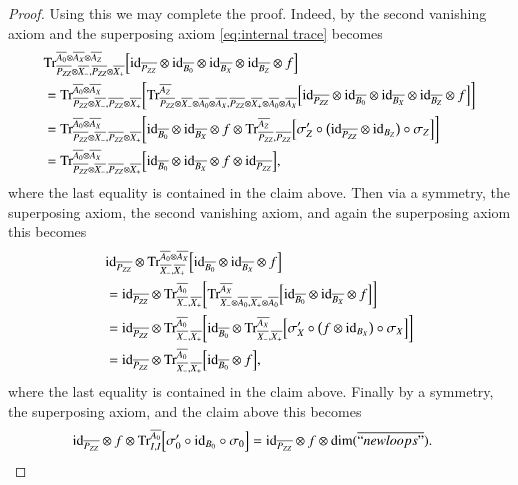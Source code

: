 \documentclass{amsart}
\def\tn{\textnormal}
\def\dim{\tn{dim}}
\def\Trace{\tn{Tr}}
\def\ol{\overline}
\def\id{\tn{id}}
\newcommand{\inp}[1]{{#1_-}}
\newcommand{\outp}[1]{{#1_+}}
\theoremstyle{remark}
\theoremstyle{definition}
\begin{document}
\begin{proof}
Using this we may complete the proof.  Indeed, by the second vanishing axiom and the superposing axiom \eqref{eq:internal trace} becomes
\begin{align*}
&\Trace^{\ol{A_0}\otimes\ol{A_X}\otimes\ol{A_Z}}_{\ol{P_{ZZ}}\otimes\ol{\inp{X}},\ol{P_{ZZ}}\otimes\ol{\outp{X}}}
\Big[\id_{\ol{P_{ZZ}}}\otimes\id_{\ol{B_0}}\otimes\id_{\ol{B_X}}\otimes\id_{\ol{B_Z}}\otimes f\Big]\\
&=\Trace^{\ol{A_0}\otimes\ol{A_X}}_{\ol{P_{ZZ}}\otimes\ol{\inp{X}},\ol{P_{ZZ}}\otimes\ol{\outp{X}}}\bigg[
\Trace^{\ol{A_Z}}_{\ol{P_{ZZ}}\otimes\ol{\inp{X}}\otimes\ol{A_0}\otimes\ol{A_X},\ol{P_{ZZ}}\otimes\ol{\outp{X}}\otimes\ol{A_0}\otimes\ol{A_X}}\Big[\id_{\ol{P_{ZZ}}}\otimes\id_{\ol{B_0}}\otimes\id_{\ol{B_X}}\otimes\id_{\ol{B_Z}}\otimes f\Big]\bigg]\\
&=\Trace^{\ol{A_0}\otimes\ol{A_X}}_{\ol{P_{ZZ}}\otimes\ol{\inp{X}},\ol{P_{ZZ}}\otimes\ol{\outp{X}}}\bigg[
\id_{\ol{B_0}}\otimes\id_{\ol{B_X}}\otimes f\otimes\Trace^{\ol{A_Z}}_{\ol{P_{ZZ}},\ol{P_{ZZ}}}\Big[\sigma_Z'\circ\big(\id_{\ol{P_{ZZ}}}\otimes\id_{B_Z}\big)\circ\sigma_Z\Big]\bigg]\\
&=\Trace^{\ol{A_0}\otimes\ol{A_X}}_{\ol{P_{ZZ}}\otimes\ol{\inp{X}},\ol{P_{ZZ}}\otimes\ol{\outp{X}}}\Big[\id_{\ol{B_0}}\otimes\id_{\ol{B_X}}\otimes f\otimes\id_{\ol{P_{ZZ}}}\Big],
\end{align*}
where the last equality is contained in the claim above.  Then via a symmetry, the superposing axiom, the second vanishing axiom, and again the superposing axiom this becomes
\begin{align*}
&\id_{\ol{P_{ZZ}}}\otimes\Trace^{\ol{A_0}\otimes\ol{A_X}}_{\ol{\inp{X}},\ol{\outp{X}}}\Big[
\id_{\ol{B_0}}\otimes\id_{\ol{B_X}}\otimes f\Big]\\
&=\id_{\ol{P_{ZZ}}}\otimes\Trace^{\ol{A_0}}_{\ol{\inp{X}},\ol{\outp{X}}}\bigg[
\Trace^{\ol{A_X}}_{\ol{\inp{X}}\otimes\ol{A_0},\ol{\outp{X}}\otimes\ol{A_0}}\Big[\id_{\ol{B_0}}\otimes\id_{\ol{B_X}}\otimes f\Big]\bigg]\\
&=\id_{\ol{P_{ZZ}}}\otimes\Trace^{\ol{A_0}}_{\ol{\inp{X}},\ol{\outp{X}}}\bigg[
\id_{\ol{B_0}}\otimes\Trace^{\ol{A_X}}_{\ol{\inp{X}},\ol{\outp{X}}}\Big[\sigma_X'\circ\big(f\otimes\id_{B_X}\big)\circ\sigma_X\Big]\bigg]\\
&=\id_{\ol{P_{ZZ}}}\otimes\Trace^{\ol{A_0}}_{\ol{\inp{X}},\ol{\outp{X}}}\Big[
\id_{\ol{B_0}}\otimes f\Big],
\end{align*}
where the last equality is contained in the claim above.  Finally by a symmetry, the superposing axiom, and the claim above this becomes
\begin{align*}
&\id_{\ol{P_{ZZ}}}\otimes f\otimes\Trace^{\ol{A_0}}_{I,I}\Big[
\sigma_0'\circ\id_{B_0}\circ\sigma_0\Big]=\id_{\ol{P_{ZZ}}}\otimes f\otimes\dim(\ol{``newloops"}).
\end{align*}


\end{proof}
\end{document}
